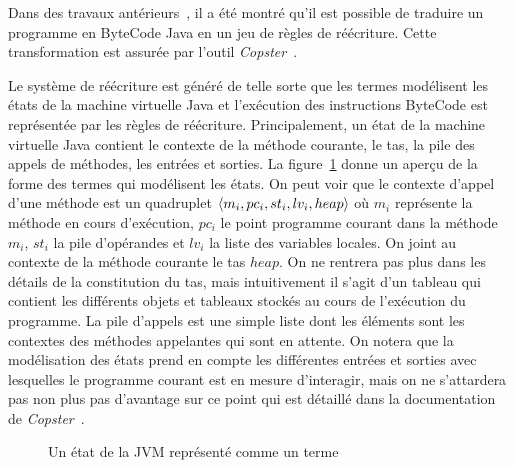 Dans des travaux antérieurs~\cite{BoichutGJL-RTA07}, 
il a été montré qu'il est possible de traduire un programme 
en ByteCode Java en un jeu de règles de réécriture. Cette transformation
est assurée par l'outil \emph{Copster}~\cite{Copster}.

Le système de réécriture est généré de telle sorte que les termes
modélisent les états de la machine virtuelle Java et l'exécution des
instructions ByteCode est représentée par les règles de
réécriture. Principalement, un état de la machine virtuelle Java
contient le contexte de la méthode courante, le tas, la pile des appels de méthodes,
les entrées et sorties.  La figure~\ref{fig:etat-terme} donne un aperçu
de la forme des termes qui modélisent les états. On peut voir que le
contexte d'appel d'une méthode est un quadruplet $\langle m_i, pc_i, st_i,
lv_i, heap\rangle$ où $m_i$ représente la méthode en cours d'exécution,
$pc_i$ le point programme courant dans la méthode $m_i$, $st_i$ la
pile d'opérandes et $lv_i$ la liste des variables locales. On joint au
contexte de la méthode courante le tas $heap$. On ne rentrera pas plus
dans les détails de la constitution du tas, mais intuitivement il
s'agit d'un tableau qui contient les différents objets et tableaux
stockés au cours de l'exécution du programme. 
La pile d'appels est une simple liste dont les éléments sont les contextes des méthodes appelantes qui sont en attente.
On notera que la modélisation des états prend en compte les différentes entrées et sorties avec lesquelles le programme courant
est en mesure d'interagir, mais on ne s'attardera pas non plus pas d'avantage sur ce point qui est détaillé dans la documentation de \emph{Copster}~\cite{Copster}.
\begin{figure}[ht!]
  \centering
  {\tiny
  }
  \caption{\footnotesize Un état de la JVM représenté comme un terme}
  \label{fig:etat-terme}
\end{figure}

